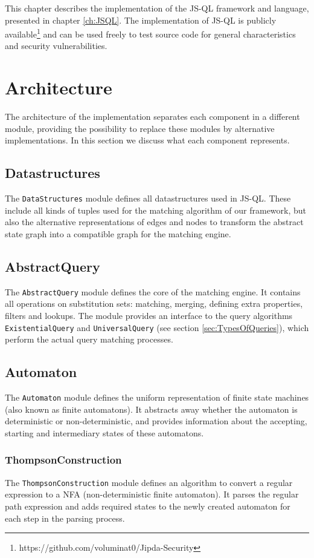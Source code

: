 This chapter describes the implementation of the JS-QL framework and language, presented in chapter \ref{ch:JSQL}. The implementation of JS-QL is publicly available\footnote{https://github.com/voluminat0/Jipda-Security} and can be used freely to test source code for general characteristics and security vulnerabilities.


\section{Architecture}
The architecture of the implementation  separates each component in a different module, providing the possibility to replace these modules by alternative implementations. In this section we discuss what each component represents.

\subsection*{Datastructures}
The \texttt{DataStructures} module defines all datastructures used in JS-QL. These include all kinds of tuples used for the matching algorithm of our framework, but also the alternative representations of edges and nodes to transform the abstract state graph into a compatible graph for the matching engine.

\subsection*{AbstractQuery}
The \texttt{AbstractQuery} module defines the core of the matching engine. It contains all operations on substitution sets: matching, merging, defining extra properties, filters and lookups. The module provides an interface to the query algorithms \texttt{ExistentialQuery} and \texttt{UniversalQuery} (see section \ref{sec:TypesOfQueries}), which perform the actual query matching processes.

\subsection*{Automaton}
The \texttt{Automaton} module defines the uniform representation of finite state machines (also known as finite automatons). It abstracts away whether the automaton is deterministic or non-deterministic, and provides information about the accepting, starting and intermediary states of these automatons.

\subsubsection*{ThompsonConstruction}
The \texttt{ThompsonConstruction} module defines an algorithm to convert a regular expression to a NFA (non-deterministic finite automaton). It parses the regular path expression and adds required states to the newly created automaton for each step in the parsing process.

